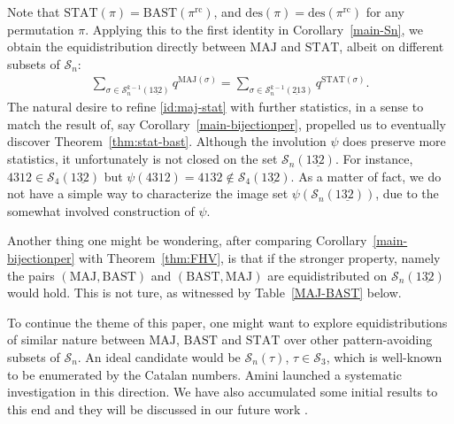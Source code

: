 \documentclass[12pt]{amsart}
\numberwithin{equation}{section}
\theoremstyle{plain}
\theoremstyle{definition}
\def\MAJ{\mathrm{MAJ}}
\def\STAT{\mathrm{STAT}}
\def\BAST{\mathrm{BAST}}
\def\des{\mathrm{des}}
\def\rc{\mathrm{rc}}
\def\SS{\mathcal{S}}
\begin{document}
Note that $\STAT(\pi)=\BAST(\pi^{\rc})$, and $\des(\pi)=\des(\pi^{\rc})$ for any permutation $\pi$. Applying this to the first identity in Corollary~\ref{main-Sn}, we obtain the equidistribution directly between $\MAJ$ and $\STAT$, albeit on different subsets of $\SS_n$:
\begin{align}\label{id:maj-stat}
\sum\limits_{\sigma \in \SS_n^{k-1}(1\underline{32})}
    q^{\MAJ(\sigma)}
=
\sum\limits_{\sigma \in \SS_n^{k-1}(\underline{21}3)}
    q^{\STAT(\sigma)}.
\end{align}
The natural desire to refine \eqref{id:maj-stat} with further statistics, in a sense to match the result of, say Corollary~\ref{main-bijectionper}, propelled us to eventually discover Theorem~\ref{thm:stat-bast}. Although the involution $\psi$ does preserve more statistics, it unfortunately is not closed on the set $\SS_n(1\underline{32})$. For instance, $4312\in\SS_4(1\underline{32})$ but $\psi(4312)=4132\not\in\SS_4(1\underline{32})$. As a matter of fact, we do not have a simple way to characterize the image set $\psi(\SS_n(1\underline{32}))$, due to the somewhat involved construction of $\psi$.

Another thing one might be wondering, after comparing Corollary~\ref{main-bijectionper} with Theorem~\ref{thm:FHV}, is that if the stronger property, namely the pairs $(\MAJ,\BAST)$ and $(\BAST,\MAJ)$ are equidistributed on $\SS_n(1\underline{32})$ would hold. This is not ture, as witnessed by Table~\ref{MAJ-BAST} below.

To continue the theme of this paper, one might want to explore equidistributions of similar nature between $\MAJ$, $\BAST$ and $\STAT$ over other pattern-avoiding subsets of $\SS_n$. An ideal candidate would be $\SS_n(\tau)$, $\tau\in\SS_3$, which is well-known to be enumerated by the Catalan numbers. Amini \cite{Am} launched a systematic investigation in this direction. We have also accumulated some initial results to this end and they will be discussed in our future work \cite{CF}.
\end{document}
